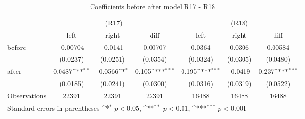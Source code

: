 \begin{table}[!ht]\centering \footnotesize
\def\sym#1{\ifmmode^{#1}\else\(^{#1}\)\fi}
\caption{Coefficients before after model R17 - R18}
\begin{tabular}{l*{6}{c}}
\hline\hline
                    &\multicolumn{3}{c}{(R17)}&\multicolumn{3}{c}{(R18)} \\
&\multicolumn{1}{c}{left}&\multicolumn{1}{c}{right}&\multicolumn{1}{c}{diff}&\multicolumn{1}{c}{left}&\multicolumn{1}{c}{right}&\multicolumn{1}{c}{diff}\\
\hline
before              &    -0.00704         &     -0.0141         &     0.00707         &      0.0364         &      0.0306         &     0.00584         \\
                    &    (0.0237)         &    (0.0251)         &    (0.0354)         &    (0.0324)         &    (0.0305)         &    (0.0480)         \\
[0.5em]
after               &      0.0487\sym{**} &     -0.0566\sym{*}  &       0.105\sym{***}&       0.195\sym{***}&     -0.0419         &       0.237\sym{***}\\
                    &    (0.0185)         &    (0.0241)         &    (0.0300)         &    (0.0316)         &    (0.0319)         &    (0.0522)         \\
\hline
Observations        &       22391         &       22391         &       22391         &       16488         &       16488         &       16488         \\
\hline\hline
\multicolumn{7}{l}{Standard errors in parentheses \sym{*} \(p<0.05\), \sym{**} \(p<0.01\), \sym{***} \(p<0.001\)}\\
\end{tabular}
\end{table}
